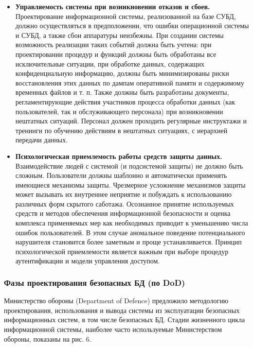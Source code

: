 \begin{itemize}
    \item \textbf{Управляемость системы при возникновении отказов и сбоев.}
        Проектирование информационной системы, реализованной на базе СУБД, должно осуществляться в предположении,
        что ошибки операционной системы и СУБД, а также сбои аппаратуры неизбежны. При создании системы
        возможность реализации таких событий должна быть учтена: при проектировании процедур и функций должны
        быть обработаны все исключительные ситуации, при обработке данных, содержащих конфиденциальную информацию,
        должны быть минимизированы риски восстановления этих данных по дампам оперативной памяти и содержимому
        временных файлов и т. п. Также должны быть разработаны документы, регламентирующие действия участников
        процесса обработки данных (как пользователей, так и обслуживающего персонала) при возникновении нештатных
        ситуаций. Персонал должен проходить регулярные инструктажи и тренинги по обучению действиям в нештатных
        ситуациях, с иерархией передачи данных.

    \item \textbf{Психологическая приемлемость работы средств защиты данных.}
        Взаимодействие людей с системой (и подсистемой защиты) не должно быть сложным. Пользователи должны
        шаблонно и автоматически применять имеющиеся механизмы защиты. Чрезмерное усложнение механизмов защиты
        может вызывать их внутреннее неприятие и побуждать к использованию различных форм скрытого саботажа.
        Осознанное принятие используемых средств и методов обеспечения информационной безопасности и оценка
        комплекса применяемых мер как необходимых приводит к уменьшению числа ошибок пользователей. В этом случае
        аномальное поведение потенциального нарушителя становится более заметным и проще устанавливается.
        Принцип психологической приемлемости является важным при выборе процедур аутентификации и модели
        управления доступом.
\end{itemize}

\subsubsection{Фазы проектирования безопасных БД (по DoD)}

Министерство обороны (Department of Defence) предложило методологию проектирования, использования и вывода
системы из эксплуатации безопасных информационных систем, в том числе безопасных БД. Стадии жизненного
цикла информационной системы, наиболее часто используемые Министерством обороны, показаны на рис. 6.

